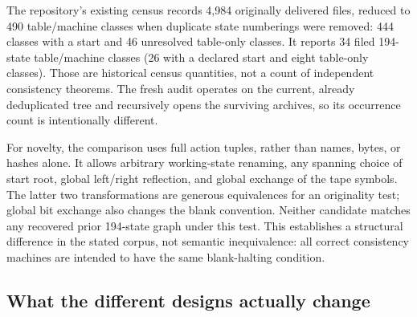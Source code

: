 \documentclass[11pt,letterpaper]{article}
\newcommand{\file}[1]{\path{#1}}
\begin{document}
The repository's existing census records 4,984 originally delivered
\file{.tm} files, reduced to 490 table/machine classes when duplicate
state numberings were removed: 444 classes with a start and 46 unresolved
table-only classes. It reports 34 filed 194-state table/machine classes
(26 with a declared start and eight table-only classes). Those are
historical census quantities, not a count of independent consistency
theorems. The fresh audit operates on the current, already deduplicated
tree and recursively opens the surviving archives, so its occurrence
count is intentionally different.



For novelty, the comparison uses full action tuples, rather than names,
bytes, or hashes alone. It allows arbitrary working-state renaming, any
spanning choice of start root, global left/right reflection, and global
exchange of the tape symbols. The latter two transformations are generous
equivalences for an originality test; global bit exchange also changes the
blank convention. Neither candidate matches any recovered prior
194-state graph under this test. This establishes a structural difference
in the stated corpus, not semantic inequivalence: all correct consistency
machines are intended to have the same blank-halting condition.

\subsection{What the different designs actually change}
\end{document}
